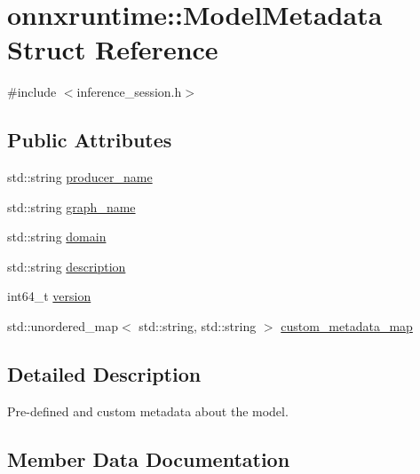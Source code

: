 \hypertarget{structonnxruntime_1_1ModelMetadata}{}\section{onnxruntime\+:\+:Model\+Metadata Struct Reference}
\label{structonnxruntime_1_1ModelMetadata}


{\ttfamily \#include $<$inference\+\_\+session.\+h$>$}

\subsection*{Public Attributes}
\begin{DoxyCompactItemize}
\item 
std\+::string \mbox{\hyperlink{structonnxruntime_1_1ModelMetadata_a62064fc5a48b7df3d939de5b1ac25879}{producer\+\_\+name}}
\item 
std\+::string \mbox{\hyperlink{structonnxruntime_1_1ModelMetadata_a70e1a3fc562003a4df38e9c68e01e693}{graph\+\_\+name}}
\item 
std\+::string \mbox{\hyperlink{structonnxruntime_1_1ModelMetadata_ab1fc358916d021b147ff2390dba22b69}{domain}}
\item 
std\+::string \mbox{\hyperlink{structonnxruntime_1_1ModelMetadata_a874b9c93a100e0aa74533014185a5fd2}{description}}
\item 
int64\+\_\+t \mbox{\hyperlink{structonnxruntime_1_1ModelMetadata_a0450f7de9dfc928d5c6cee26fc1453a3}{version}}
\item 
std\+::unordered\+\_\+map$<$ std\+::string, std\+::string $>$ \mbox{\hyperlink{structonnxruntime_1_1ModelMetadata_a48cf9284c551c4c4df59b81dcf8227fd}{custom\+\_\+metadata\+\_\+map}}
\end{DoxyCompactItemize}


\subsection{Detailed Description}
Pre-\/defined and custom metadata about the model. 

\subsection{Member Data Documentation}
\mbox{\label{structonnxruntime_1_1ModelMetadata_a48cf9284c551c4c4df59b81dcf8227fd}} 
